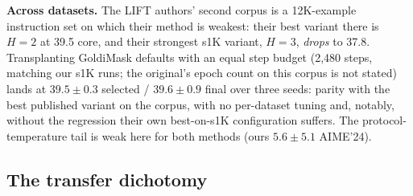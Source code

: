 \documentclass{article} %
\begin{document}
\textbf{Across datasets.} The LIFT authors' second corpus is a 12K-example instruction set on which their method is weakest: their best variant there is $H{=}2$ at 39.5 core, and their strongest s1K variant, $H{=}3$, \emph{drops} to 37.8. Transplanting GoldiMask defaults with an equal step budget (2{,}480 steps, matching our s1K runs; the original's epoch count on this corpus is not stated) lands at $39.5 \pm 0.3$ selected / $39.6 \pm 0.9$ final over three seeds: parity with the best published variant on the corpus, with no per-dataset tuning and, notably, without the regression their own best-on-s1K configuration suffers. The protocol-temperature tail is weak here for both methods (ours $5.6 \pm 5.1$ AIME'24).

\subsection{The transfer dichotomy}
\label{sec:v3results}
\end{document}
